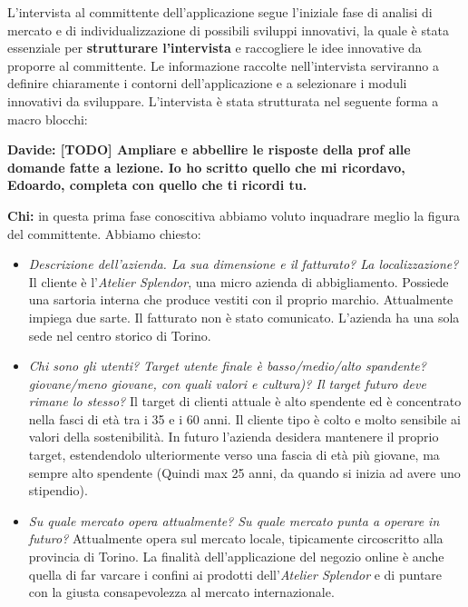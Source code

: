 \documentclass[12pt]{article}
\newcommand{\davide}[1]{{\bf \color{chromeyellow} Davide: #1 }}
\begin{document}
L'intervista al committente dell'applicazione segue l'iniziale fase di analisi di mercato e di individualizzazione di possibili sviluppi innovativi, la quale è stata essenziale per \textbf{strutturare l'intervista} e raccogliere le idee innovative da proporre al committente. Le informazione raccolte nell'intervista serviranno a definire chiaramente i contorni dell'applicazione e a selezionare i moduli innovativi da sviluppare. L'intervista è stata strutturata nel seguente forma a macro blocchi:

\davide{[TODO] Ampliare e abbellire le risposte della prof alle domande fatte a lezione. Io ho scritto quello che mi ricordavo, Edoardo, completa con quello che ti ricordi tu.}

\textbf{Chi:} in questa prima fase conoscitiva abbiamo voluto inquadrare meglio la figura del committente. Abbiamo chiesto:
\begin{itemize}
    \item {\em Descrizione dell'azienda. La sua dimensione e il fatturato? La localizzazione?} Il cliente è l'{\em Atelier Splendor}, una micro azienda di abbigliamento. Possiede una sartoria interna che produce vestiti con il proprio marchio. Attualmente impiega due sarte. Il fatturato non è stato comunicato. L'azienda ha una sola sede nel centro storico di Torino.
    \item {\em Chi sono gli utenti? Target utente finale è basso/medio/alto spandente? giovane/meno giovane, con quali valori e cultura)? Il target futuro deve rimane lo stesso?} Il target di clienti attuale è alto spendente ed è concentrato nella fasci di età tra i 35 e i 60 anni. Il cliente tipo è colto e molto sensibile ai valori della sostenibilità. In futuro l'azienda desidera mantenere il proprio target, estendendolo ulteriormente verso una fascia di età più giovane, ma sempre alto spendente (Quindi max 25 anni, da quando si inizia ad avere uno stipendio).  
    \item {\em Su quale mercato opera attualmente? Su quale mercato punta a operare in futuro?} Attualmente opera sul mercato locale, tipicamente circoscritto alla provincia di Torino. La finalità dell'applicazione del negozio online è anche quella di far varcare i confini ai prodotti dell'{\em Atelier Splendor} e di puntare con la giusta consapevolezza al mercato internazionale.
\end{itemize}
\end{document}
